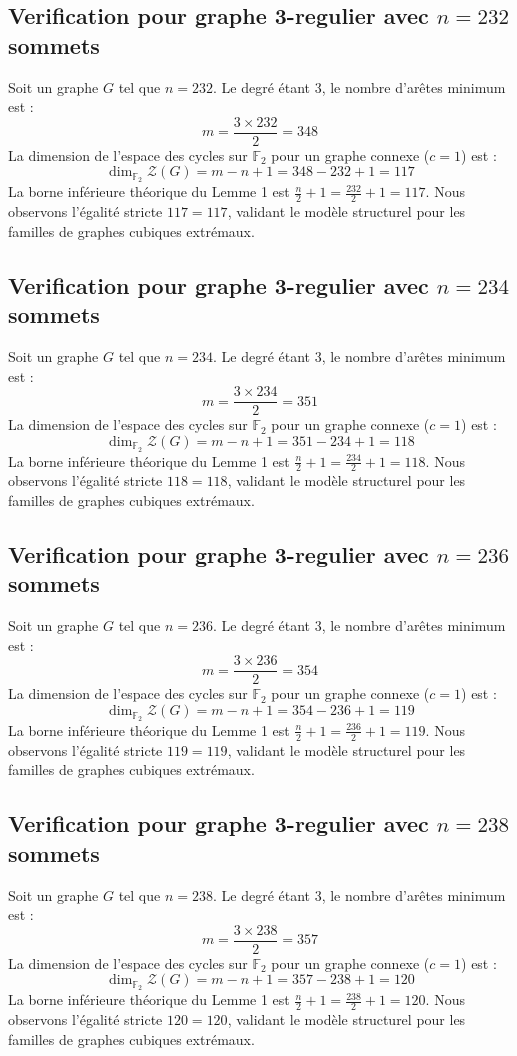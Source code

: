 \documentclass[11pt,a4paper]{article}
\begin{document}
\subsection{Verification pour graphe 3-regulier avec $n=232$ sommets}
Soit un graphe $G$ tel que $n = 232$. Le degré étant 3, le nombre d'arêtes minimum est :
$$ m = \frac{3 \times 232}{2} = 348 $$
La dimension de l'espace des cycles sur $\mathbb{F}_2$ pour un graphe connexe ($c=1$) est :
$$ \dim_{\mathbb{F}_2} \mathcal{Z}(G) = m - n + 1 = 348 - 232 + 1 = 117 $$
La borne inférieure théorique du Lemme 1 est $\frac{n}{2} + 1 = \frac{232}{2} + 1 = 117$.
Nous observons l'égalité stricte $117 = 117$, validant le modèle structurel pour les familles de graphes cubiques extrémaux.

\subsection{Verification pour graphe 3-regulier avec $n=234$ sommets}
Soit un graphe $G$ tel que $n = 234$. Le degré étant 3, le nombre d'arêtes minimum est :
$$ m = \frac{3 \times 234}{2} = 351 $$
La dimension de l'espace des cycles sur $\mathbb{F}_2$ pour un graphe connexe ($c=1$) est :
$$ \dim_{\mathbb{F}_2} \mathcal{Z}(G) = m - n + 1 = 351 - 234 + 1 = 118 $$
La borne inférieure théorique du Lemme 1 est $\frac{n}{2} + 1 = \frac{234}{2} + 1 = 118$.
Nous observons l'égalité stricte $118 = 118$, validant le modèle structurel pour les familles de graphes cubiques extrémaux.

\subsection{Verification pour graphe 3-regulier avec $n=236$ sommets}
Soit un graphe $G$ tel que $n = 236$. Le degré étant 3, le nombre d'arêtes minimum est :
$$ m = \frac{3 \times 236}{2} = 354 $$
La dimension de l'espace des cycles sur $\mathbb{F}_2$ pour un graphe connexe ($c=1$) est :
$$ \dim_{\mathbb{F}_2} \mathcal{Z}(G) = m - n + 1 = 354 - 236 + 1 = 119 $$
La borne inférieure théorique du Lemme 1 est $\frac{n}{2} + 1 = \frac{236}{2} + 1 = 119$.
Nous observons l'égalité stricte $119 = 119$, validant le modèle structurel pour les familles de graphes cubiques extrémaux.

\subsection{Verification pour graphe 3-regulier avec $n=238$ sommets}
Soit un graphe $G$ tel que $n = 238$. Le degré étant 3, le nombre d'arêtes minimum est :
$$ m = \frac{3 \times 238}{2} = 357 $$
La dimension de l'espace des cycles sur $\mathbb{F}_2$ pour un graphe connexe ($c=1$) est :
$$ \dim_{\mathbb{F}_2} \mathcal{Z}(G) = m - n + 1 = 357 - 238 + 1 = 120 $$
La borne inférieure théorique du Lemme 1 est $\frac{n}{2} + 1 = \frac{238}{2} + 1 = 120$.
Nous observons l'égalité stricte $120 = 120$, validant le modèle structurel pour les familles de graphes cubiques extrémaux.
\end{document}
